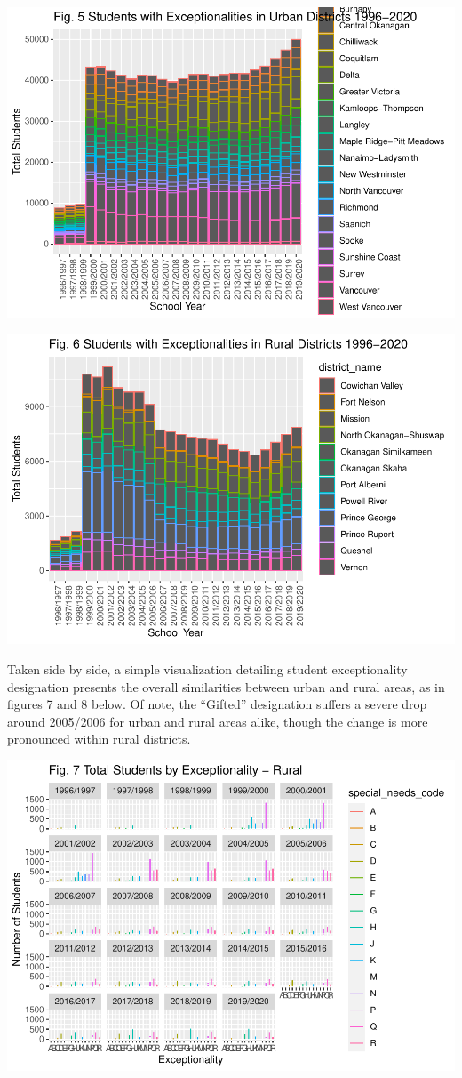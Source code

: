\documentclass[
  english,
  man,floatsintext]{apa6}
\begin{document}
\includegraphics{Final_project_files/figure-latex/rainbow figure urban-1.pdf}

\includegraphics{Final_project_files/figure-latex/rainbow figure rural-1.pdf}

Taken side by side, a simple visualization detailing student exceptionality designation presents the overall similarities between urban and rural areas, as in figures 7 and 8 below. Of note, the \enquote{Gifted} designation suffers a severe drop around 2005/2006 for urban and rural areas alike, though the change is more pronounced within rural districts.

\includegraphics{Final_project_files/figure-latex/rural facet bars-1.pdf}
\end{document}

